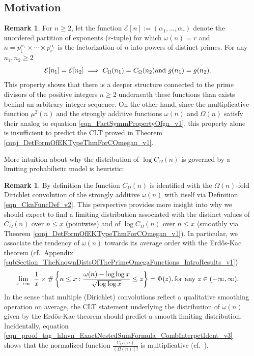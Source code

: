 \documentclass[11pt,reqno,a4letter]{article}
\newcommand{\hlocalref}[1]{\hyperref[#1]{\ref{#1}}}
\numberwithin{equation}{section}
\numberwithin{figure}{section}
\numberwithin{table}{section}
\newcommand{\cf}{cf.~}
\theoremstyle{plain}
\numberwithin{theorem}{section}
\theoremstyle{definition}
\newtheorem{remark}[theorem]{Remark}
\theoremstyle{remark}
\newcommand{\mathtext}[1]{\text{\rm #1}}
\begin{document}
\subsection{Motivation}

\begin{remark}
\label{remark_COmegaFuncDistIntutitionFromErdosKac_v1}
For $n \geq 2$, let the function 
$\mathcal{E}[n] := (\alpha_1, \ldots, \alpha_r)$ denote the unordered 
partition of exponents ($r$-tuple) for which $\omega(n) = r$ and 
$n = p_1^{\alpha_1} \times \cdots \times p_r^{\alpha_r}$ is the factorization of 
$n$ into powers of distinct primes. 
For any $n_1,n_2 \geq 2$ 
\begin{equation}
\label{eqn_FactSymmPropertyOfgn_v1} 
\mathcal{E}[n_1] = \mathcal{E}[n_2] \implies C_{\Omega}(n_1) = C_{\Omega}(n_2) \mathtext{ and } 
	g(n_1) = g(n_2). 
\end{equation}
This property shows that there is a deeper structure connected to the 
prime divisors of the positive integers $n \geq 2$ underneath these functions 
than exists behind an arbitrary integer sequence. 
On the other hand, since the multiplicative function $\mu^2(n)$ and the 
strongly additive functions $\omega(n)$ and $\Omega(n)$ satisfy their 
analog to equation \eqref{eqn_FactSymmPropertyOfgn_v1}, 
this property alone is insufficient to predict the CLT proved in 
Theorem \hlocalref{conj_DetFormOfEKTypeThmForCOmegan_v1}. 
\end{remark}

More intuition about why the distribution of $\log C_{\Omega}(n)$ 
is governed by a limiting probabilistic model is heuristic: 

\begin{remark}
By definition the function $C_{\Omega}(n)$ is identified with the $\Omega(n)$-fold 
Dirichlet convolution of the strongly additive $\omega(n)$ with itself via 
Definition \hlocalref{eqn_CknFuncDef_v2}. 
This perspective provides more insight into why we should expect to find a limiting distribution 
associated with the distinct values of 
$C_{\Omega}(n)$ over $n \leq x$ (pointwise) and of $\log C_{\Omega}(n)$ over $n \leq x$ 
(smoothly via Theorem \hlocalref{conj_DetFormOfEKTypeThmForCOmegan_v1}). 
In particular, we associate the tendency of $\omega(n)$ towards its average order 
with the Erd\H{o}s-Kac theorem 
(\cf Appendix \hlocalref{subSection_TheKnownDistsOfThePrimeOmegaFunctions_IntroResults_v1}) 
\[
\lim_{x \rightarrow \infty}\ \frac{1}{x} \times \#\left\{n \leq x: 
     \frac{\omega(n) - \log\log x}{\sqrt{\log\log x}} \leq z\right\} = \Phi(z), 
	\mathtext{ for any } z \in (-\infty, \infty). 
\]
In the sense that multiple (Dirichlet) convolutions 
reflect a qualitative smoothing operation on average, the CLT statement underlying the 
distribution of $\omega(n)$ given by the Erd\H{o}s-Kac theorem 
should predict a smooth limiting distribution. 
Incidentally, equation \eqref{eqn_proof_tag_hInvn_ExactNestedSumFormula_CombInterpetIdent_v3} 
shows that the normalized function $\frac{C_{\Omega}(n)}{(\Omega(n))!}$ is multiplicative 
(\cf \cite{ELLIOTT-V1}). 
\end{remark}
\end{document}
